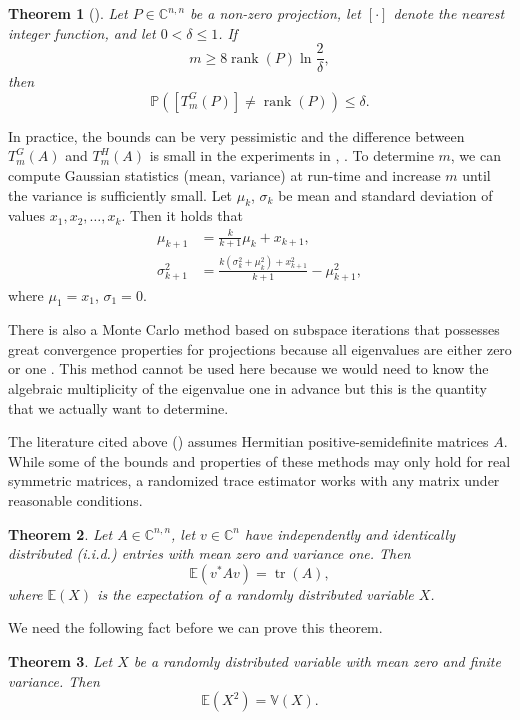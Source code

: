 \documentclass[%
	paper=a4,
	fontsize=10pt,
	DIV11,BCOR10mm,
	numbers=noenddot,
	abstract=yes
]{scrartcl}
\newcommand{\F}{\mathbb{C}}
\DeclareMathOperator{\rank}{rank}
\newtheorem{theorem}{Theorem}[section]
\theoremstyle{definition}
\begin{document}
\begin{theorem}[{\cite[Corollary~4]{Roosta-Khorasani2015}}]
	Let $P \in \F^{n,n}$ be a non-zero projection, let $[\cdot]$ denote the
	nearest integer function, and let $0 < \delta \leq 1$. If
	\[ m \geq 8 \rank(P) \ln \frac{2}{\delta}, \]
	then
	\[ \mathbb{P}\left( [T_m^G(P)] \neq \rank(P) \right) \leq \delta. \]
\end{theorem}

In practice, the bounds can be very pessimistic and the difference between
$T_m^G(A)$ and $T_m^H(A)$ is small in the experiments in
\cite[§5]{Roosta-Khorasani2015}, \cite[§9]{Avron2011}. To determine $m$, we can
compute Gaussian statistics (mean, variance) at run-time and increase $m$ until
the variance is sufficiently small. Let $\mu_k$, $\sigma_k$ be mean and standard
deviation of values $x_1, x_2, \dotsc, x_k$. Then it holds that
\begin{align*}
	\mu_{k+1} &= \frac{k}{k+1} \mu_k + x_{k+1}, \\
	\sigma_{k+1}^2 &=
		\frac{k (\sigma_k^2 + \mu_k^2) + x_{k+1}^2}{k+1} - \mu_{k+1}^2,
\end{align*}
where $\mu_1 = x_1$, $\sigma_1 = 0$.

There is also a Monte Carlo method based on subspace iterations that possesses
great convergence properties for projections because all eigenvalues are either
zero or one \cite{Saibaba2016}. This method cannot be used here because we would
need to know the algebraic multiplicity of the eigenvalue one in advance but
this is the quantity that we actually want to determine.

The literature cited above (\cite{Avron2011,Roosta-Khorasani2015,Saibaba2016})
assumes Hermitian positive-semidefinite matrices $A$. While some of the bounds
and properties of these methods may only hold for real symmetric matrices, a
randomized trace estimator works with any matrix under reasonable conditions.

\begin{theorem}
\label{thm:general-trace-expectation}
	Let $A \in \F^{n,n}$, let $v \in \F^n$ have independently and identically
	distributed (i.i.d.) entries with mean zero and variance one. Then
	\[ \mathbb{E}( v^* A v ) = \operatorname{tr}(A), \]
	where $\mathbb{E}(X)$ is the expectation of a randomly distributed
	variable $X$.
\end{theorem}

We need the following fact before we can prove this theorem.

\begin{theorem}
	Let $X$ be a randomly distributed variable with mean zero and finite
	variance. Then
	\[ \mathbb{E}(X^2) = \mathbb{V}(X). \]
\end{theorem}
\end{document}
